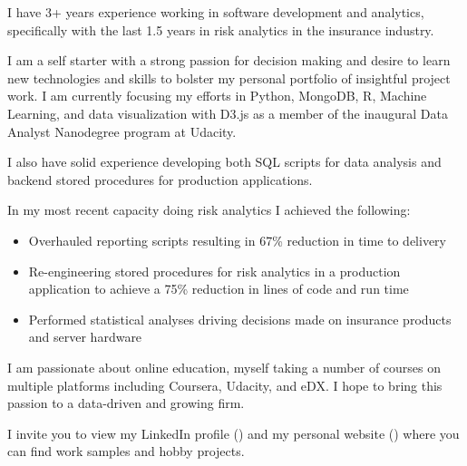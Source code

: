 \documentclass[10pt,a4paper,sans]{moderncv}        %
\begin{document}
I have 3+ years experience working in software development and analytics, specifically with the last 1.5 years in risk analytics in the insurance industry.

I am a self starter with a strong passion for decision making and desire to learn new technologies and skills to bolster my personal portfolio of insightful project work.  I am currently focusing my efforts in Python, MongoDB, R, Machine Learning, and data visualization with D3.js as a member of the inaugural Data Analyst Nanodegree program at Udacity.  

I also have solid experience developing both SQL scripts for data analysis and backend stored procedures for production applications.

In my most recent capacity doing risk analytics I achieved the following:

\begin{itemize}
\item{Overhauled reporting scripts resulting in 67\% reduction in time to delivery}
\item{Re-engineering stored procedures for risk analytics in a production application to achieve a 75\% reduction in lines of code and run time}
\item{Performed statistical analyses driving decisions made on insurance products and server hardware}
\end{itemize}

I am passionate about online education, myself taking a number of courses on multiple platforms including Coursera, Udacity, and eDX.  I hope to bring this passion to a data-driven and growing firm.

I invite you to view my LinkedIn profile () and my personal website () where you can find work samples and hobby projects.


\makeletterclosing

\end{document}
